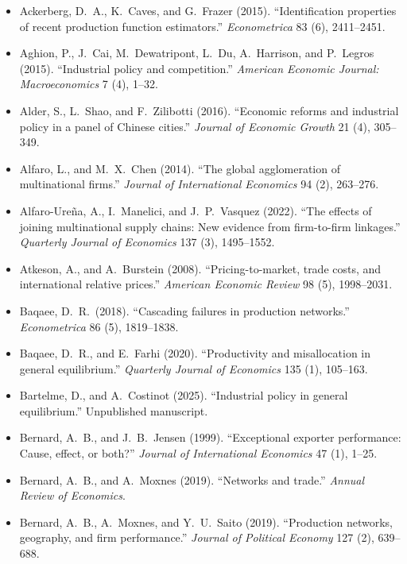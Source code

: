 \documentclass[11pt,a4paper]{article}
\begin{document}
\begin{itemize}
\item Ackerberg, D.\ A., K.\ Caves, and G.\ Frazer (2015). ``Identification properties of recent production function estimators.'' \textit{Econometrica} 83 (6), 2411--2451.
\item Aghion, P., J.\ Cai, M.\ Dewatripont, L.\ Du, A.\ Harrison, and P.\ Legros (2015). ``Industrial policy and competition.'' \textit{American Economic Journal: Macroeconomics} 7 (4), 1--32.
\item Alder, S., L.\ Shao, and F.\ Zilibotti (2016). ``Economic reforms and industrial policy in a panel of Chinese cities.'' \textit{Journal of Economic Growth} 21 (4), 305--349.
\item Alfaro, L., and M.\ X.\ Chen (2014). ``The global agglomeration of multinational firms.'' \textit{Journal of International Economics} 94 (2), 263--276.
\item Alfaro-Ure\~na, A., I.\ Manelici, and J.\ P.\ Vasquez (2022). ``The effects of joining multinational supply chains: New evidence from firm-to-firm linkages.'' \textit{Quarterly Journal of Economics} 137 (3), 1495--1552.
\item Atkeson, A., and A.\ Burstein (2008). ``Pricing-to-market, trade costs, and international relative prices.'' \textit{American Economic Review} 98 (5), 1998--2031.
\item Baqaee, D.\ R.\ (2018). ``Cascading failures in production networks.'' \textit{Econometrica} 86 (5), 1819--1838.
\item Baqaee, D.\ R., and E.\ Farhi (2020). ``Productivity and misallocation in general equilibrium.'' \textit{Quarterly Journal of Economics} 135 (1), 105--163.
\item Bartelme, D., and A.\ Costinot (2025). ``Industrial policy in general equilibrium.'' Unpublished manuscript.
\item Bernard, A.\ B., and J.\ B.\ Jensen (1999). ``Exceptional exporter performance: Cause, effect, or both?'' \textit{Journal of International Economics} 47 (1), 1--25.
\item Bernard, A.\ B., and A.\ Moxnes (2019). ``Networks and trade.'' \textit{Annual Review of Economics}.
\item Bernard, A.\ B., A.\ Moxnes, and Y.\ U.\ Saito (2019). ``Production networks, geography, and firm performance.'' \textit{Journal of Political Economy} 127 (2), 639--688.

\end{itemize}
\end{document}
